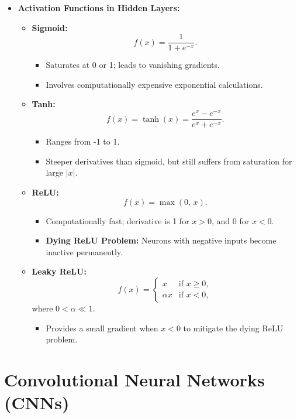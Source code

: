 \documentclass{article}
\begin{document}
\begin{itemize}
    \item \textbf{Activation Functions in Hidden Layers:}
    \begin{itemize}
        \item \textbf{Sigmoid:} 
        \[
        f(x) = \frac{1}{1 + e^{-x}}.
        \]
        \begin{itemize}
            \item Saturates at 0 or 1; leads to vanishing gradients.
            \item Involves computationally expensive exponential calculations.
        \end{itemize}
        \item \textbf{Tanh:}
        \[
        f(x) = \tanh(x) = \frac{e^x - e^{-x}}{e^x + e^{-x}}.
        \]
        \begin{itemize}
            \item Ranges from -1 to 1.
            \item Steeper derivatives than sigmoid, but still suffers from saturation for large \(|x|\).
        \end{itemize}
        \item \textbf{ReLU:}
        \[
        f(x) = \max(0,\,x).
        \]
        \begin{itemize}
            \item Computationally fast; derivative is 1 for \(x > 0\), and 0 for \(x < 0\).
            \item \textbf{Dying ReLU Problem:} Neurons with negative inputs become inactive permanently.
        \end{itemize}
        \item \textbf{Leaky ReLU:}
        \[
        f(x) = 
        \begin{cases}
           x & \text{if } x \ge 0,\\[1mm]
           \alpha x & \text{if } x < 0,
        \end{cases}
        \]
        where \(0 < \alpha \ll 1\).
        \begin{itemize}
            \item Provides a small gradient when \(x < 0\) to mitigate the dying ReLU problem.
        \end{itemize}
    \end{itemize}
\end{itemize}

\section{Convolutional Neural Networks (CNNs)}
\end{document}
